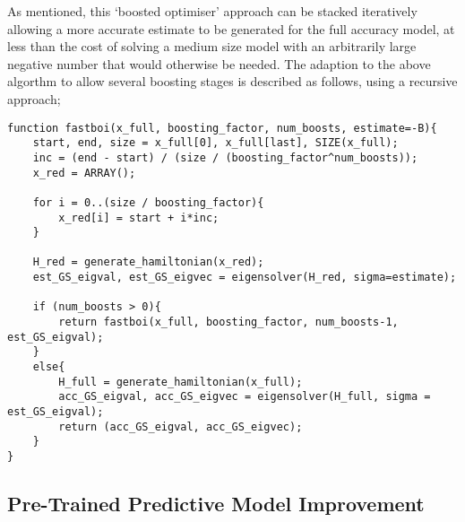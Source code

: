 As mentioned, this `boosted optimiser' approach can be stacked iteratively allowing a more accurate estimate to be generated for the full accuracy model, at less than the cost of solving a medium size model with an arbitrarily large negative number that would otherwise be needed. The adaption to the above algorthm to allow several boosting stages is described as follows, using a recursive approach;

\begin{lstlisting}
function fastboi(x_full, boosting_factor, num_boosts, estimate=-B){
	start, end, size = x_full[0], x_full[last], SIZE(x_full);
	inc = (end - start) / (size / (boosting_factor^num_boosts));
	x_red = ARRAY();

	for i = 0..(size / boosting_factor){
		x_red[i] = start + i*inc;
	}

	H_red = generate_hamiltonian(x_red); 
	est_GS_eigval, est_GS_eigvec = eigensolver(H_red, sigma=estimate);
	
	if (num_boosts > 0){
		return fastboi(x_full, boosting_factor, num_boosts-1, est_GS_eigval);
	}
	else{
		H_full = generate_hamiltonian(x_full);
		acc_GS_eigval, acc_GS_eigvec = eigensolver(H_full, sigma = est_GS_eigval);
		return (acc_GS_eigval, acc_GS_eigvec);
	}
}
\end{lstlisting}

\subsection{Pre-Trained Predictive Model Improvement}


